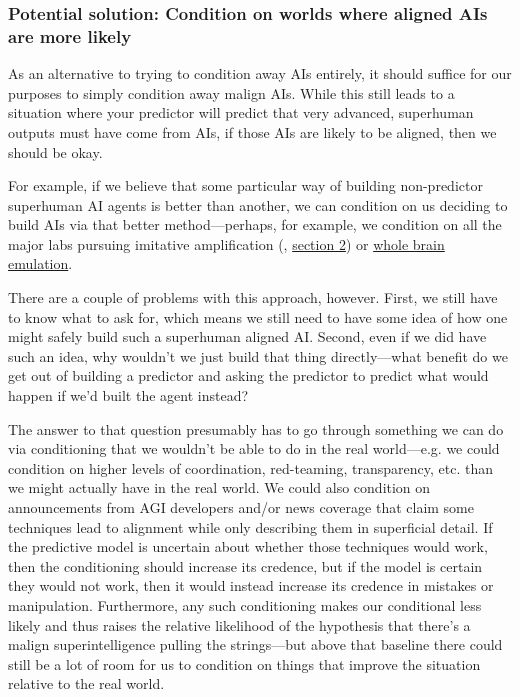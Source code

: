\documentclass[
  onecolumn,
  nonatbib,
]{miri-tech-article}
\begin{document}
\subsubsection{Potential solution: Condition on worlds where aligned AIs are more likely}

As an alternative to trying to condition away AIs entirely, it should suffice for our purposes to simply condition away malign AIs. While this still leads to a situation where your predictor will predict that very advanced, superhuman outputs must have come from AIs, if those AIs are likely to be aligned, then we should be okay.

For example, if we believe that some particular way of building non-predictor superhuman AI agents is better than another, we can condition on us deciding to build AIs via that better method---perhaps, for example, we condition on all the major labs pursuing imitative amplification (\cite{11_proposals}, \href{https://www.alignmentforum.org/posts/fRsjBseRuvRhMPPE5/an-overview-of-11-proposals-for-building-safe-advanced-ai#2__Imitative_amplification___intermittent_oversight}{section 2}) or \href{https://www.lesswrong.com/tag/whole-brain-emulation}{whole brain emulation}.

There are a couple of problems with this approach, however. First, we still have to know what to ask for, which means we still need to have some idea of how one might safely build such a superhuman aligned AI. Second, even if we did have such an idea, why wouldn't we just build that thing directly---what benefit do we get out of building a predictor and asking the predictor to predict what would happen if we'd built the agent instead?

The answer to that question presumably has to go through something we can do via conditioning that we wouldn't be able to do in the real world---e.g. we could condition on higher levels of coordination, red-teaming, transparency, etc. than we might actually have in the real world. We could also condition on announcements from AGI developers and/or news coverage that claim some techniques lead to alignment while only describing them in superficial detail. If the predictive model is uncertain about whether those techniques would work, then the conditioning should increase its credence, but if the model is certain they would not work, then it would instead increase its credence in mistakes or manipulation. Furthermore, any such conditioning makes our conditional less likely and thus raises the relative likelihood of the hypothesis that there's a malign superintelligence pulling the strings---but above that baseline there could still be a lot of room for us to condition on things that improve the situation relative to the real world.
\end{document}

